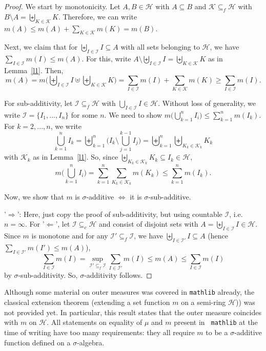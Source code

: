 \documentclass[lean]{AFM}
\begin{document}
\begin{proof}
  We start by monotonicity. Let $A, B\in\mathcal H$ with $A\subseteq
  B$ and $\mathcal K \subseteq_f \mathcal H$ with $B \setminus A =
  \biguplus_{K\in\mathcal K} K$. Therefore, we can write $m(A) \leq
  m(A) + \sum_{K\in\mathcal K} m(K) = m(B)$.

  Next, we claim that for $\biguplus_{I\in\mathcal I} I \subseteq A$
  with all sets belonging to $\mathcal H$, we have $\sum_{I \in \mathcal
    I} m(I) \leq m(A)$. For this, write $A \setminus \biguplus_{I\in
    \mathcal I} I = \biguplus_{K\in\mathcal K} K$ as in
  Lemma~\ref{l1}. Then,
  $$ m(A) = m\Big(\biguplus_{I\in\mathcal I} I \uplus
  \biguplus_{K\in\mathcal K} K\Big) = \sum_{I\in\mathcal I} m(I) +
  \sum_{K\in\mathcal K} m(K) \geq \sum_{I\in\mathcal I} m(I). $$

  For sub-additivity, let $\mathcal I \subseteq_f \mathcal H$ with
  $\bigcup_{I \in \mathcal I} I \in \mathcal H$. Without loss of
  generality, we write $\mathcal I = \{I_1,...,I_n\}$ for some $n$. We
  need to show $m\Big(\bigcup_{k=1}^n I_i\Big) \leq \sum_{k=1}^n
  m(I_k)$. For $k=2,...,n$, we write
  $$ \bigcup_{k=1}^n I_k = \biguplus_{k=1}^n \Big(I_k \setminus
  \bigcup_{j=1}^{k-1} I_j\Big) = \biguplus_{k=1}^n \biguplus_{K_k \in
    \mathcal K_k} K_k$$ with $\mathcal K_k$ as in Lemma~\ref{l1}. So,
  since $\biguplus_{K_k \in \mathcal K_k} K_k \subseteq I_k \in
  \mathcal H$,
  $$ m\Big(\bigcup_{k=1}^n I_i\Big) = \sum_{k=1}^n \sum_{K_k \in
    \mathcal K_k} m(K_k) \leq \sum_{k=1}^n m(I_k).$$

  \noindent
  Now, we show that $m$ is $\sigma$-additive $\iff$ it is
  $\sigma$-sub-additive.

  \noindent
  '$\Rightarrow$': Here, just copy the proof of sub-additivity, but
  using countable $\mathcal I$, i.e.\ $n=\infty$. For '$\Leftarrow$',
  let $\mathcal I \subseteq_c \mathcal H$ and consist of
  disjoint sets with $A = \biguplus_{I \in \mathcal I} I \in\mathcal
  H$. Since $m$ is monotone and for any $\mathcal I' \subseteq_f
  \mathcal I$, we have $\biguplus_{I\in\mathcal I'} I \subseteq A$
  (hence $\sum_{I \in \mathcal I'} m(I') \leq m(A)$),
  $$ \sum_{I \in \mathcal I} m(I) = \sup_{\mathcal I' \subseteq_f
    \mathcal I} \sum_{I \in \mathcal I'} m(I) \leq m(A) \leq \sum_{I
    \in \mathcal I} m(I)$$ by $\sigma$-sub-additivity. So,
  $\sigma$-additivity follows.
\end{proof}

\noindent
Although some material on outer measures was covered in {\tt mathlib}
already, the classical extension theorem (extending a set function $m$
on a semi-ring $\mathcal H$)) was not provided yet. In particular, this
result states that the outer measure coincides with $m$ on $\mathcal
H$. All statements on equality of $\mu$ and $m$ present in {\tt
  mathlib} at the time of writing have too many requirements: they all require $m$ to be a $\sigma$-additive function defined on a $\sigma$-algebra.
\end{document}
